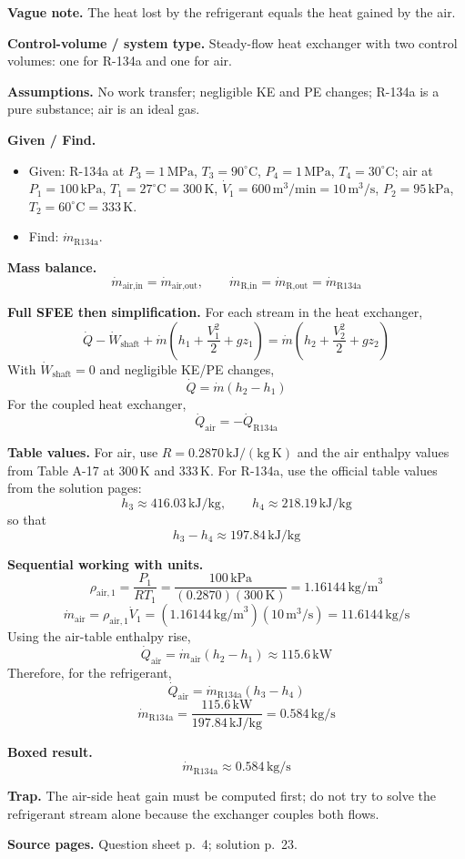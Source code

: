 \textbf{Vague note.} The heat lost by the refrigerant equals the heat gained by the air.

\textbf{Control-volume / system type.} Steady-flow heat exchanger with two control volumes: one for R-134a and one for air.

\textbf{Assumptions.} No work transfer; negligible KE and PE changes; R-134a is a pure substance; air is an ideal gas.

\textbf{Given / Find.}
\begin{itemize}
  \item Given: R-134a at $P_3=1\,\text{MPa}$, $T_3=90^\circ\text{C}$, $P_4=1\,\text{MPa}$, $T_4=30^\circ\text{C}$; air at $P_1=100\,\text{kPa}$, $T_1=27^\circ\text{C}=300\,\text{K}$, $\dot V_1=600\,\text{m}^3/\text{min}=10\,\text{m}^3/\text{s}$, $P_2=95\,\text{kPa}$, $T_2=60^\circ\text{C}=333\,\text{K}$.
  \item Find: $\dot m_{\text{R134a}}$.
\end{itemize}

\textbf{Mass balance.}
\[
\dot m_{\text{air,in}}=\dot m_{\text{air,out}},\qquad
\dot m_{\text{R,in}}=\dot m_{\text{R,out}}=\dot m_{\text{R134a}}
\]

\textbf{Full SFEE then simplification.}
For each stream in the heat exchanger,
\[
\dot Q-\dot W_{\text{shaft}}+\dot m\left(h_1+\frac{V_1^2}{2}+gz_1\right)
=\dot m\left(h_2+\frac{V_2^2}{2}+gz_2\right)
\]
With $\dot W_{\text{shaft}}=0$ and negligible KE/PE changes,
\[
\dot Q = \dot m(h_2-h_1)
\]
For the coupled heat exchanger,
\[
\dot Q_{\text{air}} = -\dot Q_{\text{R134a}}
\]

\textbf{Table values.} For air, use $R=0.2870\,\mathrm{kJ/(kg\,K)}$ and the air enthalpy values from Table A-17 at $300\,\text{K}$ and $333\,\text{K}$. For R-134a, use the official table values from the solution pages:
\[
 h_3 \approx 416.03\,\text{kJ/kg}, \qquad h_4 \approx 218.19\,\text{kJ/kg}
\]
so that
\[
 h_3-h_4 \approx 197.84\,\text{kJ/kg}
\]

\textbf{Sequential working with units.}
\[
\rho_{\text{air},1}=\frac{P_1}{RT_1}=\frac{100\,\text{kPa}}{(0.2870)(300\,\text{K})}=1.16144\,\text{kg/m}^3
\]
\[
\dot m_{\text{air}}=\rho_{\text{air},1}\dot V_1=(1.16144\,\text{kg/m}^3)(10\,\text{m}^3/\text{s})=11.6144\,\text{kg/s}
\]
Using the air-table enthalpy rise,
\[
\dot Q_{\text{air}}=\dot m_{\text{air}}(h_2-h_1)\approx 115.6\,\text{kW}
\]
Therefore, for the refrigerant,
\[
\dot Q_{\text{air}} = \dot m_{\text{R134a}}(h_3-h_4)
\]
\[
\dot m_{\text{R134a}} = \frac{115.6\,\text{kW}}{197.84\,\text{kJ/kg}} = 0.584\,\text{kg/s}
\]

\textbf{Boxed result.}
\[
\boxed{\dot m_{\text{R134a}} \approx 0.584\,\text{kg/s}}
\]

\textbf{Trap.} The air-side heat gain must be computed first; do not try to solve the refrigerant stream alone because the exchanger couples both flows.

\textbf{Source pages.} Question sheet p.~4; solution p.~23.
